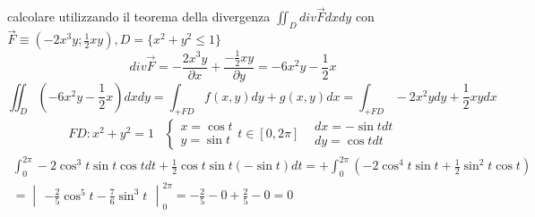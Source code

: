 \begin{esempio}
	calcolare utilizzando il teorema della divergenza $\iint_D div\vec{F}dxdy$
	con $\vec{F}\equiv (-2x^3y;\frac{1}{2}xy), D=\{x^2+y^2\leq 1\}$
	\begin{equation*}
		div \vec{F}=-\frac{2x^3y}{\partial x}+\frac{-\frac{1}{2}xy}{\partial
		y}= -6x^2y-\frac{1}{2}x
	\end{equation*}
	\begin{equation*}
		\iint_D(-6x^2y-\frac{1}{2}x)dxdy=\int_{+FD}f(x,y)dy+g(x,y)dx=\int_{+FD}
		-2x^2ydy+\frac{1}{2}xydx
	\end{equation*}
	\begin{eqnarray*}
		FD:x^2+y^2=1 & \begin{cases}
			x=\cos t \\
			y=\sin t
		\end{cases} t\in [0,2\pi] & \begin{matrix}
			dx=-\sin t dt\\
			dy=\cos t dt
		\end{matrix}
	\end{eqnarray*}
	\begin{eqnarray*}
		\int_{0}^{2\pi} -2\cos^3 t \sin t\cos t dt + \frac{1}{2}\cos t \sin t
		(-\sin t) dt= +\int_{0}^{2\pi} \left(-2\cos^4t\sin t +
		\frac{1}{2}\sin^2t \cos t\right)\\=\begin{vmatrix}
			-\frac{2}{5} \cos^5 t - \frac{7}{6}\sin^3 t
		\end{vmatrix}^{2\pi}_0 =-\frac{2}{5}-0+\frac{2}{5} -0=0
	\end{eqnarray*}
\end{esempio}
